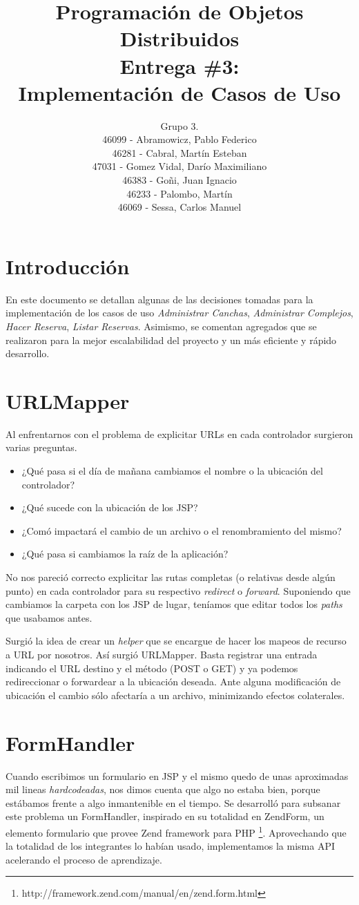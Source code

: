 \documentclass[a4paper,11pt]{article}
\title{
        Programación de Objetos Distribuidos \\
        Entrega \#3: \\
        Implementación de Casos de Uso
    }
\author{
        Grupo 3. \\
        46099 - Abramowicz, Pablo Federico \\
        46281 - Cabral, Martín Esteban \\
        47031 - Gomez Vidal, Darío Maximiliano \\
        46383 - Goñi, Juan Ignacio \\
        46233 - Palombo, Martín \\
        46069 - Sessa, Carlos Manuel
        }
\date{}
\begin{document}
\maketitle
\pagebreak

\section{Introducción}
En este documento se detallan algunas de las decisiones tomadas para la 
implementación de los
casos de uso \emph{Administrar Canchas}, \emph{Administrar Complejos},
\emph{Hacer Reserva}, \emph{Listar Reservas}. Asimismo, se comentan agregados
que se realizaron para la mejor escalabilidad del proyecto y un más eficiente y
rápido desarrollo.

\section{URLMapper}
Al enfrentarnos con el problema de explicitar URLs en cada controlador
surgieron varias preguntas.
\begin{itemize}
 \item ¿Qué pasa si el día de mañana cambiamos el nombre o la ubicación
del controlador?
 \item ¿Qué sucede con la ubicación de los JSP?
 \item ¿Comó impactará el cambio de un archivo o el renombramiento del mismo?
 \item ¿Qué pasa si cambiamos la raíz de la aplicación?
\end{itemize}

No nos pareció correcto explicitar las rutas completas (o relativas desde
algún punto) en cada controlador para su respectivo \emph{redirect} o
\emph{forward}. Suponiendo que cambiamos la carpeta con los JSP de
lugar, teníamos que editar todos los \emph{paths} que usabamos antes.

Surgió la idea de crear un \emph{helper} que se encargue de hacer los
mapeos de recurso a URL por nosotros. Así surgió URLMapper.
Basta registrar una entrada indicando el URL destino y el método
(POST o GET) y ya podemos redireccionar o forwardear a la ubicación
deseada. Ante alguna modificación de ubicación el cambio sólo afectaría
a un archivo, minimizando efectos colaterales.

\section{FormHandler}
Cuando escribimos un formulario en JSP y el mismo quedo de unas aproximadas
mil lineas \emph{hardcodeadas}, nos dimos cuenta que algo no estaba bien,
porque estábamos frente a algo inmantenible en el tiempo.
Se desarrolló para subsanar este problema un FormHandler, inspirado en su
totalidad en ZendForm, un elemento formulario que provee Zend framework
para PHP \footnote{http://framework.zend.com/manual/en/zend.form.html}.
Aprovechando que la totalidad de los integrantes lo habían usado,
implementamos la misma API acelerando el proceso de aprendizaje.
\end{document}
